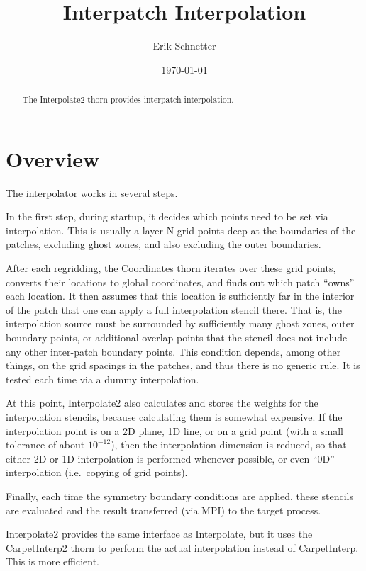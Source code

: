 \documentclass{article}
\begin{document}
\author{Erik Schnetter}
\title{Interpatch Interpolation}

\date{\today}

\maketitle


\begin{abstract}
The Interpolate2 thorn provides interpatch interpolation.
\end{abstract}

\section{Overview}

The interpolator works in several steps.

In the first step, during startup, it decides which points need to be
set via interpolation. This is usually a layer N grid points deep at
the boundaries of the patches, excluding ghost zones, and also
excluding the outer boundaries.

After each regridding, the Coordinates thorn iterates over these grid points, converts
their locations to global coordinates, and finds out which patch ``owns''
each location. It then assumes that this location is sufficiently far
in the interior of the patch that one can apply a full interpolation
stencil there. That is, the interpolation source must be surrounded by
sufficiently many ghost zones, outer boundary points, or additional
overlap points that the stencil does not include any other inter-patch
boundary points. This condition depends, among other things, on the
grid spacings in the patches, and thus there is no generic rule. It is
tested each time via a dummy interpolation.

At this point, Interpolate2 also calculates and stores the weights for the
interpolation stencils, because calculating them is somewhat
expensive. If the interpolation point is on a 2D plane, 1D line, or on
a grid point (with a small tolerance of about $10^{-12}$), then the
interpolation dimension is reduced, so that either 2D or 1D
interpolation is performed whenever possible, or even ``0D''
interpolation (i.e.~copying of grid points).

Finally, each time the symmetry boundary conditions are applied, these
stencils are evaluated and the result transferred (via MPI) to the
target process.

Interpolate2 provides the same interface as Interpolate, but it uses
the CarpetInterp2 thorn to perform the actual interpolation instead of
CarpetInterp.  This is more efficient.

\end{document}
